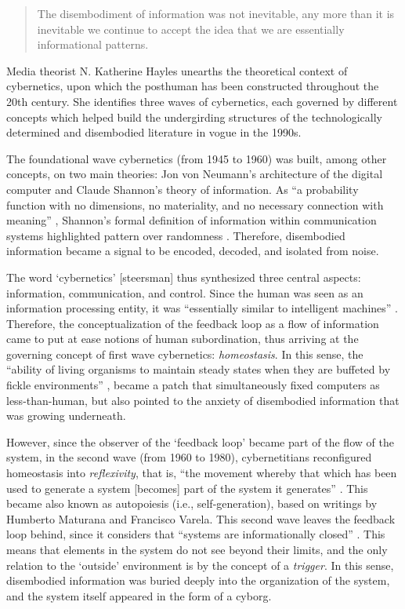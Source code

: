 \begin{quote}
	The disembodiment of information was not inevitable, any more than it is inevitable we continue to accept the idea that we are essentially informational patterns. \parencite[22]{Hay99:How}
\end{quote}

Media theorist N. Katherine Hayles \parencite{Hay99:How} unearths the theoretical context of cybernetics, upon which the posthuman has been constructed throughout the 20th century. She identifies three waves of cybernetics, each governed by different concepts which helped build the undergirding structures of the technologically determined and disembodied literature in vogue in the 1990s. 

The foundational wave cybernetics (from 1945 to 1960) was built, among other concepts, on two main theories: Jon von Neumann's architecture of the digital computer  and Claude Shannon's theory of information. As ``a probability function with no dimensions, no materiality, and no necessary connection with meaning'' \parencite[18]{Hay99:How}, Shannon's formal definition of information within communication systems highlighted pattern over randomness \parencite[33]{Hay99:How}. Therefore, disembodied information became a signal to be encoded, decoded, and isolated from noise.

The word `cybernetics' [steersman] thus synthesized three central aspects: information, communication, and control. Since the human was seen as an information processing entity, it was ``essentially similar to intelligent machines'' \parencite[7]{Hay99:How}. Therefore, the conceptualization of the feedback loop as a flow of information came to put at ease notions of human subordination, thus arriving at the governing concept of first wave cybernetics: \textit{homeostasis}. In this sense, the ``ability of living organisms to maintain steady states when they are buffeted by fickle environments'' \parencite[8]{Hay99:How}, became a patch that simultaneously fixed computers as less-than-human, but also pointed to the anxiety of disembodied information that was growing underneath.

However, since the observer of the `feedback loop' became part of the flow of the system, in the second wave (from 1960 to 1980), cybernetitians reconfigured homeostasis into \textit{reflexivity}, that is, ``the movement whereby that which has been used to generate a system [becomes] part of the system it generates'' \parencite[8]{Hay99:How}. This became also known as autopoiesis (i.e., self-generation), based on writings by Humberto Maturana and Francisco Varela. This second wave leaves the feedback loop behind, since it considers that ``systems are informationally closed'' \parencite[10]{Hay99:How}. This means that elements in the system do not see beyond their limits, and the only relation to the `outside' environment is by the concept of a \textit{trigger}. In this sense, disembodied information was buried deeply into the organization of the system, and the system itself appeared in the form of a cyborg.

